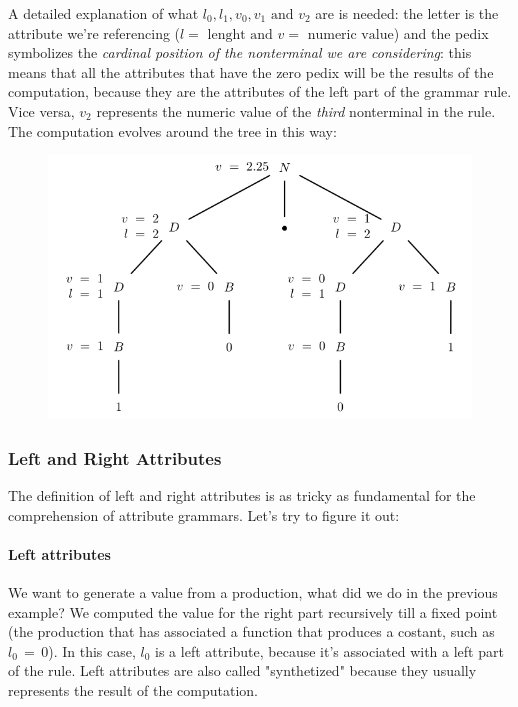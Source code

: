 \documentclass[10pt,a4paper]{article}
\begin{document}
					A detailed explanation of what $l_0, l_1, v_0, v_1 \text{ and } v_2$ are is needed: the letter is the attribute we're referencing ($l = \text{ lenght and } v = \text{ numeric value}$) and the pedix symbolizes the \emph{cardinal position of the nonterminal we are considering}: this means that all the attributes that have the zero pedix will be the results of the computation, because they are the attributes of the left part of the grammar rule. Vice versa, $v_2$ represents the numeric value of the \emph{third} nonterminal in the rule.\\
					The computation evolves around the tree in this way:
					\begin{figure}[H]
						\centering
						\includegraphics[width = \textwidth]{./images/decoratedTree.png}
					\end{figure}
					
				\subsubsection{Left and Right Attributes}
					The definition of left and right attributes is as tricky as fundamental for the comprehension of attribute grammars. Let's try to figure it out:
					\paragraph{Left attributes}
						We want to generate a value from a production, what did we do in the previous example? We computed the value for the right part recursively till a fixed point (the production that has associated a function that produces a costant, such as $l_0 \,=\, 0$). In this case, $l_0$ is a left attribute, because it's associated with a left part of the rule. Left attributes are also called "synthetized" because they usually represents the result of the computation.
\end{document}
